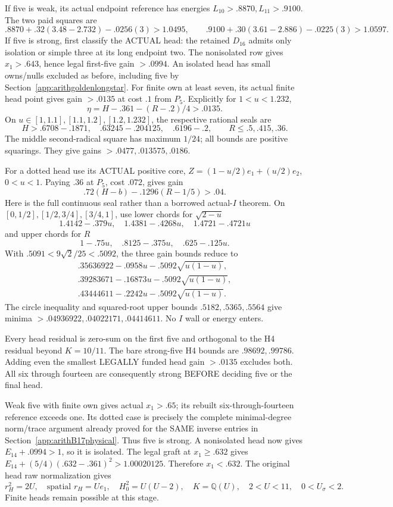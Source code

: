 If five is weak, its actual endpoint reference
has energies \(L_{10}>.8870,L_{11}>.9100\).
The two paid squares are
\[
 .8870+.32(3.48-2.732)-.0256(3)>1.0495,\qquad
 .9100+.30(3.61-2.886)-.0225(3)>1.0597 .
\]
If five is strong, first classify the ACTUAL
head: the retained \(D_{16}\) admits only isolation
or simple three at its long endpoint two.
The nonisolated row gives \(x_1>.643\), hence
legal first-five gain \(>.0994\).
An isolated head has small owns/nulls excluded
as before, including five by
Section~\ref{app:arithgoldenlongstar}.
For finite own at least seven, its actual finite
head point gives gain \(>.0135\) at cost \(.1\)
from \(P_5\).
Explicitly for \(1<u<1.232\),
\[
 \eta=H-.361-(R-.2)/4>.0135 .
\]
On \(u\in[1,1.1],[1.1,1.2],[1.2,1.232]\),
the respective rational seals are
\[
 H>.6708-.1871,\quad .63245-.204125,\quad .6196-.2,
 \qquad R\le.5,.415,.36 .
\]
The middle second-radical square has maximum
\(1/24\); all bounds are positive squarings.
They give gains \(>.0477,.013575,.0186\).

For a dotted head use its ACTUAL positive core,
\(Z=(1-u/2)e_1+(u/2)e_2\), \(0<u<1\).
Paying \(.36\) at \(P_5\), cost \(.072\),
gives gain
\[
                .72(H-b)-.1296(R-1/5)>.04 .
\tag{D17H}\label{eq:arithD17dotgain}
\]
Here is the full continuous seal rather than a
borrowed actual-\(I\) theorem.
On \([0,1/2],[1/2,3/4],[3/4,1]\), use lower
chords for \(\sqrt{2-u}\)
\[
1.4142-.379u,\quad1.4381-.4268u,\quad1.4721-.4721u
\]
and upper chords for \(R\)
\[
1-.75u,\quad.8125-.375u,\quad.625-.125u.
\]
With \(.5091<9\sqrt2/25<.5092\), the three
gain bounds reduce to
\[
\begin{array}{l}
 .35636922-.0958u-.5092\sqrt{u(1-u)},\\
 .39283671-.16873u-.5092\sqrt{u(1-u)},\\
 .43444611-.2242u-.5092\sqrt{u(1-u)} .
\end{array}
\]
The circle inequality and squared-root upper
bounds \(.5182,.5365,.5564\) give minima
\(>.04936922,.04022171,.04414611\).
No \(I\) wall or energy enters.

Every head residual is zero-sum on the first
five and orthogonal to the H4 residual beyond
\(K=10/11\).
The bare strong-five H4 bounds are
\(.98692,.99786\).
Adding even the smallest LEGALLY funded head
gain \(>.0135\) excludes both.
All six through fourteen are consequently strong
BEFORE deciding five or the final head.

Weak five with finite own gives actual
\(x_1>.65\); its rebuilt six-through-fourteen
reference exceeds one.
Its dotted case is precisely the complete
minimal-degree norm/trace argument already
proved for the SAME inverse entries in
Section~\ref{app:arithB17physical}.
Thus five is strong.
A nonisolated head now gives
\(E_{14}+.0994>1\), so it is isolated.
The legal graft at \(x_1\ge.632\) gives
\(E_{14}+(5/4)(.632-.361)^2>1.00020125\).
Therefore \(x_1<.632\).
The original head raw normalization gives
\[
 r_H^2=2U,\quad\text{spatial }r_H=Ue_1,\quad
 H_0^2=U(U-2),\quad K=\mathbb Q(U),\quad
               2<U<11,\quad0<U_\sigma<2 .
\]
Finite heads remain possible at this stage.

